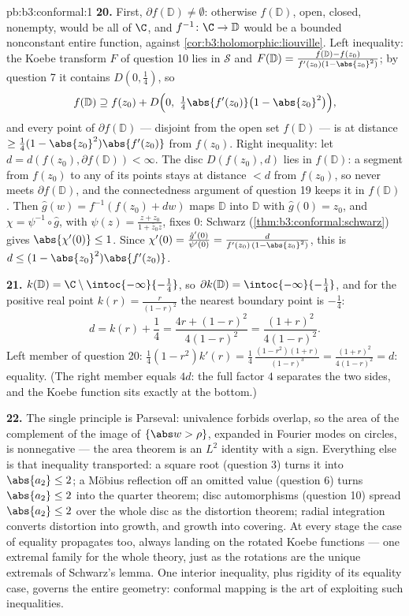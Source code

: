 \begin{solution}{pb:b3:conformal:1}
\textbf{20.} First, $\partial f(\mathbb D) \neq \emptyset$:
otherwise $f(\mathbb D)$, open, closed, nonempty, would be
all of $\C$, and $f^{-1} \colon \C \to \mathbb D$ would be a
bounded nonconstant entire function, against
\cref{cor:b3:holomorphic:liouville}. Left inequality: the
Koebe transform $F$ of question 10 lies in $\mathcal S$ and
$F(\mathbb D) = \frac{f(\mathbb D) -
f(z_0)}{f'(z_0)(1-\abs{z_0}^2)}$; by question 7 it contains
$D(0, \frac14)$, so
\[
f(\mathbb D) \supseteq f(z_0) + D\Bigl(0,\
\tfrac14\abs{f'(z_0)}\bigl(1 - \abs{z_0}^2\bigr)\Bigr) ,
\]
and every point of $\partial f(\mathbb D)$ --- disjoint from
the open set $f(\mathbb D)$ --- is at distance $\geq
\frac14(1-\abs{z_0}^2)\abs{f'(z_0)}$ from $f(z_0)$. Right
inequality: let $d = d(f(z_0), \partial f(\mathbb D)) <
\infty$. The disc $D(f(z_0), d)$ lies in $f(\mathbb D)$: a
segment from $f(z_0)$ to any of its points stays at distance
$< d$ from $f(z_0)$, so never meets $\partial f(\mathbb D)$,
and the connectedness argument of question 19 keeps it in
$f(\mathbb D)$. Then $\hat g(w) = f^{-1}(f(z_0) + dw)$ maps
$\mathbb D$ into $\mathbb D$ with $\hat g(0) = z_0$, and
$\chi = \psi^{-1}\circ\hat g$, with $\psi(z) = \frac{z +
z_0}{1 + \bar z_0z}$, fixes $0$: Schwarz
(\cref{thm:b3:conformal:schwarz}) gives $\abs{\chi'(0)}
\leq 1$. Since $\chi'(0) = \frac{\hat g'(0)}{\psi'(0)} =
\frac{d}{f'(z_0)\,(1 - \abs{z_0}^2)}$, this is $d \leq (1 -
\abs{z_0}^2)\abs{f'(z_0)}$.

\textbf{21.} $k(\mathbb D) = \C\setminus
\intoc{-\infty}{-\frac14}$, so $\partial k(\mathbb D) =
\intoc{-\infty}{-\frac14}$, and for the positive real point
$k(r) = \frac r{(1-r)^2}$ the nearest boundary point is
$-\frac14$:
\[
d = k(r) + \frac14 = \frac{4r + (1-r)^2}{4(1-r)^2}
= \frac{(1+r)^2}{4(1-r)^2} .
\]
Left member of question 20: $\frac14(1 - r^2)k'(r) =
\frac14\,\frac{(1-r^2)(1+r)}{(1-r)^3} =
\frac{(1+r)^2}{4(1-r)^2} = d$: equality. (The right member
equals $4d$: the full factor $4$ separates the two sides,
and the Koebe function sits exactly at the bottom.)

\textbf{22.} The single principle is Parseval: univalence
forbids overlap, so the area of the complement of the image
of $\{\abs w > \rho\}$, expanded in Fourier modes on
circles, is nonnegative --- the area theorem is an $L^2$
identity with a sign. Everything else is that inequality
transported: a square root (question 3) turns it into
$\abs{a_2} \leq 2$; a M\"obius reflection off an omitted
value (question 6) turns $\abs{a_2} \leq 2$ into the quarter
theorem; disc automorphisms (question 10) spread $\abs{a_2}
\leq 2$ over the whole disc as the distortion theorem;
radial integration converts distortion into growth, and
growth into covering. At every stage the case of equality
propagates too, always landing on the rotated Koebe
functions --- one extremal family for the whole theory, just
as the rotations are the unique extremals of Schwarz's
lemma. One interior inequality, plus rigidity of its
equality case, governs the entire geometry: conformal
mapping is the art of exploiting such inequalities.


\end{solution}
